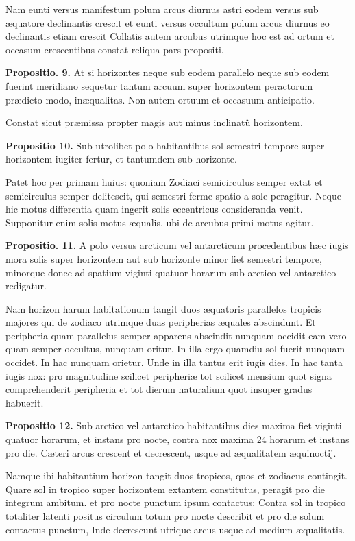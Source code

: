 \documentclass[11pt,a4paper]{article}
\begin{document}
Nam eunti versus manifestum polum arcus diurnus astri eodem versus sub æquatore declinantis crescit et eunti versus occultum polum arcus diurnus eo declinantis etiam crescit Collatis autem arcubus utrimque hoc est ad ortum et occasum crescentibus constat reliqua pars propositi.

\textbf{Propositio. 9.} At si horizontes neque sub eodem parallelo neque sub eodem fuerint meridiano sequetur tantum arcuum super horizontem peractorum prædicto modo, inæqualitas. Non autem ortuum et occasuum anticipatio.

Constat sicut præmissa propter magis aut minus inclinatũ horizontem.

\textbf{Propositio 10.} Sub utrolibet polo habitantibus sol semestri tempore super horizontem iugiter fertur, et tantumdem sub horizonte.

Patet hoc per primam huius: quoniam Zodiaci semicirculus semper extat et semicirculus semper delitescit, qui semestri ferme spatio a sole peragitur. Neque hic motus differentia quam ingerit solis eccentricus consideranda venit. Supponitur enim solis motus æqualis. ubi de arcubus primi motus agitur.

\textbf{Propositio. 11.} A polo versus arcticum vel antarcticum procedentibus hæc iugis mora solis super horizontem aut sub horizonte minor fiet semestri tempore, minorque donec ad spatium viginti quatuor horarum sub arctico vel antarctico redigatur.

Nam horizon harum habitationum tangit duos æquatoris parallelos tropicis majores qui de zodiaco utrimque duas peripherias æquales abscindunt. Et peripheria quam parallelus semper apparens abscindit nunquam occidit eam vero quam semper occultus, nunquam oritur. In illa ergo quamdiu sol fuerit nunquam occidet. In hac nunquam orietur. Unde in illa tantus erit iugis dies. In hac tanta iugis nox: pro magnitudine scilicet peripheriæ tot scilicet mensium quot signa comprehenderit peripheria et tot dierum naturalium quot insuper gradus habuerit.

\textbf{Propositio 12.} Sub arctico vel antarctico habitantibus dies maxima fiet viginti quatuor horarum, et instans pro nocte, contra nox maxima 24 horarum et instans pro die. Cæteri arcus crescent et decrescent, usque ad æqualitatem æquinoctij.

Namque ibi habitantium horizon tangit duos tropicos, quos et zodiacus contingit. Quare sol in tropico super horizontem extantem constitutus, peragit pro die integrum ambitum. et pro nocte punctum ipsum contactus: Contra sol in tropico totaliter latenti positus circulum totum pro nocte describit et pro die solum contactus punctum, Inde decrescunt utrique arcus usque ad medium æqualitatis.
\end{document}
